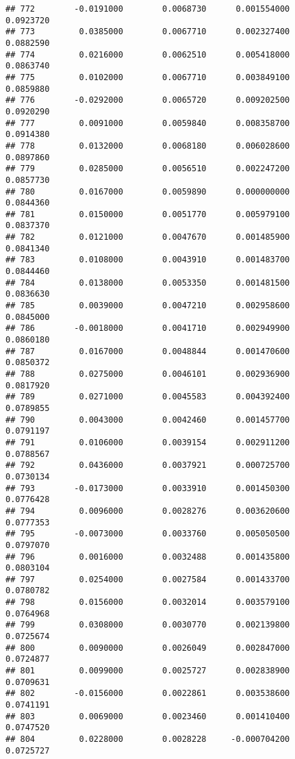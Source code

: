\documentclass[
]{article}
\begin{document}
\begin{verbatim}
## 772        -0.0191000        0.0068730      0.001554000             0.0923720
## 773         0.0385000        0.0067710      0.002327400             0.0882590
## 774         0.0216000        0.0062510      0.005418000             0.0863740
## 775         0.0102000        0.0067710      0.003849100             0.0859880
## 776        -0.0292000        0.0065720      0.009202500             0.0920290
## 777         0.0091000        0.0059840      0.008358700             0.0914380
## 778         0.0132000        0.0068180      0.006028600             0.0897860
## 779         0.0285000        0.0056510      0.002247200             0.0857730
## 780         0.0167000        0.0059890      0.000000000             0.0844360
## 781         0.0150000        0.0051770      0.005979100             0.0837370
## 782         0.0121000        0.0047670      0.001485900             0.0841340
## 783         0.0108000        0.0043910      0.001483700             0.0844460
## 784         0.0138000        0.0053350      0.001481500             0.0836630
## 785         0.0039000        0.0047210      0.002958600             0.0845000
## 786        -0.0018000        0.0041710      0.002949900             0.0860180
## 787         0.0167000        0.0048844      0.001470600             0.0850372
## 788         0.0275000        0.0046101      0.002936900             0.0817920
## 789         0.0271000        0.0045583      0.004392400             0.0789855
## 790         0.0043000        0.0042460      0.001457700             0.0791197
## 791         0.0106000        0.0039154      0.002911200             0.0788567
## 792         0.0436000        0.0037921      0.000725700             0.0730134
## 793        -0.0173000        0.0033910      0.001450300             0.0776428
## 794         0.0096000        0.0028276      0.003620600             0.0777353
## 795        -0.0073000        0.0033760      0.005050500             0.0797070
## 796         0.0016000        0.0032488      0.001435800             0.0803104
## 797         0.0254000        0.0027584      0.001433700             0.0780782
## 798         0.0156000        0.0032014      0.003579100             0.0764968
## 799         0.0308000        0.0030770      0.002139800             0.0725674
## 800         0.0090000        0.0026049      0.002847000             0.0724877
## 801         0.0099000        0.0025727      0.002838900             0.0709631
## 802        -0.0156000        0.0022861      0.003538600             0.0741191
## 803         0.0069000        0.0023460      0.001410400             0.0747520
## 804         0.0228000        0.0028228     -0.000704200             0.0725727

\end{verbatim}
\end{document}
